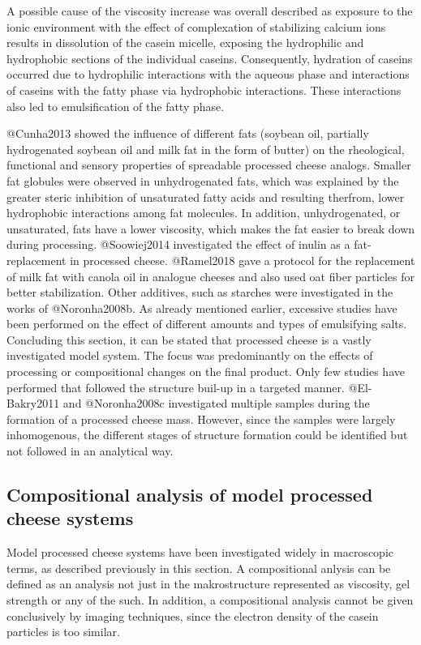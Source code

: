 \documentclass[
]{article}
\begin{document}
A possible cause of the viscosity increase was overall described as
exposure to the ionic environment with the effect of complexation of
stabilizing calcium ions results in dissolution of the casein micelle,
exposing the hydrophilic and hydrophobic sections of the individual
caseins. Consequently, hydration of caseins occurred due to hydrophilic
interactions with the aqueous phase and interactions of caseins with the
fatty phase via hydrophobic interactions. These interactions also led to
emulsification of the fatty phase.

@Cunha2013 showed the influence of different fats (soybean oil,
partially hydrogenated soybean oil and milk fat in the form of butter)
on the rheological, functional and sensory properties of spreadable
processed cheese analogs. Smaller fat globules were observed in
unhydrogenated fats, which was explained by the greater steric
inhibition of unsaturated fatty acids and resulting therfrom, lower
hydrophobic interactions among fat molecules. In addition,
unhydrogenated, or unsaturated, fats have a lower viscosity, which makes
the fat easier to break down during processing. @Soowiej2014
investigated the effect of inulin as a fat-replacement in processed
cheese. @Ramel2018 gave a protocol for the replacement of milk fat with
canola oil in analogue cheeses and also used oat fiber particles for
better stabilization. Other additives, such as starches were
investigated in the works of @Noronha2008b. As already mentioned
earlier, excessive studies have been performed on the effect of
different amounts and types of emulsifying salts. Concluding this
section, it can be stated that processed cheese is a vastly investigated
model system. The focus was predominantly on the effects of processing
or compositional changes on the final product. Only few studies have
performed that followed the structure buil-up in a targeted manner.
@El-Bakry2011 and @Noronha2008c investigated multiple samples during the
formation of a processed cheese mass. However, since the samples were
largely inhomogenous, the different stages of structure formation could
be identified but not followed in an analytical way.

\subsection{Compositional analysis of model processed cheese systems}

Model processed cheese systems have been investigated widely in
macroscopic terms, as described previously in this section. A
compositional anlysis can be defined as an analysis not just in the
makrostructure represented as viscosity, gel strength or any of the
such. In addition, a compositional analysis cannot be given conclusively
by imaging techniques, since the electron density of the casein
particles is too similar.
\end{document}
